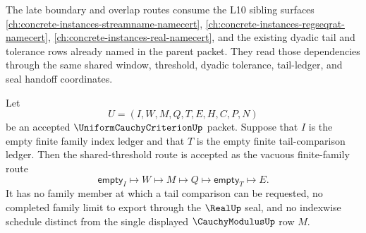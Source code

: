 The late boundary and overlap routes consume the L10 sibling surfaces \autoref{ch:concrete-instances-streamname-namecert}, \autoref{ch:concrete-instances-regseqrat-namecert}, \autoref{ch:concrete-instances-real-namecert}, and the existing dyadic tail and tolerance rows already named in the parent packet. They read those dependencies through the same shared window, threshold, dyadic tolerance, tail-ledger, and seal handoff coordinates.

\begin{theorem}
\label{thm:uniform-cauchy-criterion-empty-family-tail-ledger}
Let
$$
U=(I,W,M,Q,T,E,H,C,P,N)
$$
be an accepted $\UniformCauchyCriterionUp$ packet. Suppose that $I$ is the empty finite family index ledger and that $T$ is the empty finite tail-comparison ledger. Then the shared-threshold route is accepted as the vacuous finite-family route
$$
\mathsf{empty}_{I} \longmapsto W \longmapsto M \longmapsto Q \longmapsto \mathsf{empty}_{T} \longmapsto E.
$$
It has no family member at which a tail comparison can be requested, no completed family limit to export through the $\RealUp$ seal, and no indexwise schedule distinct from the single displayed $\CauchyModulusUp$ row $M$.
\end{theorem}
